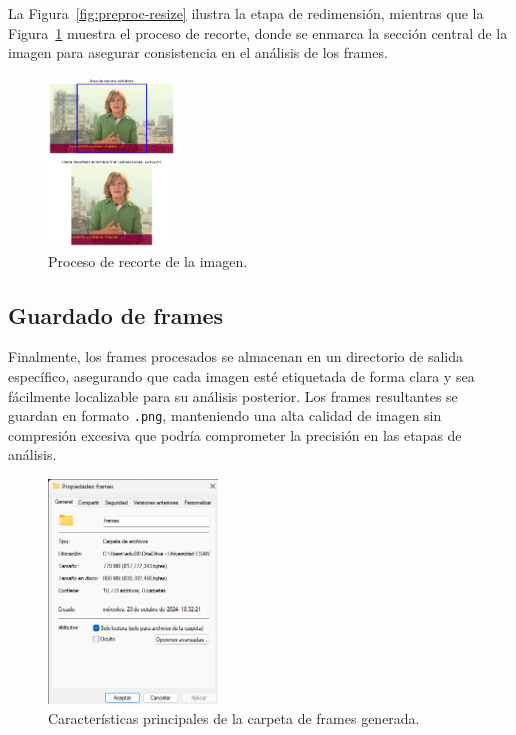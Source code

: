 La Figura~\ref{fig:preproc-resize} ilustra la etapa de redimensión, mientras que la Figura~\ref{fig:preproc-crop} muestra el proceso de recorte, donde se enmarca la sección central de la imagen para asegurar consistencia en el análisis de los frames.

\begin{figure}[H]
    \centering
    \includegraphics[width=0.30\textwidth]{4/figures/Preprocesamiento_2.png}
    \caption{Proceso de recorte de la imagen.}
    \label{fig:preproc-crop}
\end{figure}



\subsection{Guardado de frames}

Finalmente, los frames procesados se almacenan en un directorio de salida específico, asegurando que cada imagen esté etiquetada de forma clara y sea fácilmente localizable para su análisis posterior. Los frames resultantes se guardan en formato \texttt{.png}, manteniendo una alta calidad de imagen sin compresión excesiva que podría comprometer la precisión en las etapas de análisis.

\begin{figure}[H]
    \centering
    \includegraphics[width=0.40\textwidth]{4/figures/Guardado_1.png}
    \caption{Características principales de la carpeta de frames generada.}
    \label{fig:convolucion}
\end{figure}

